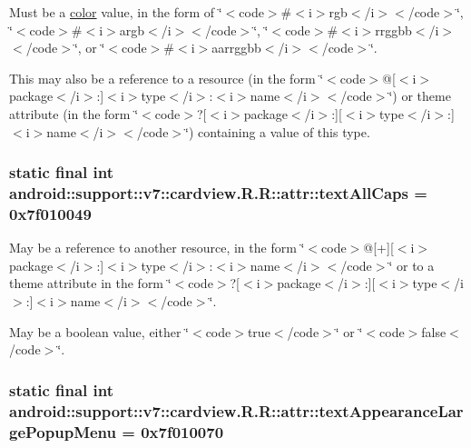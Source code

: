 Must be a \hyperlink{classandroid_1_1support_1_1v7_1_1cardview_1_1_r_1_1color}{color} value, in the form of \char`\"{}$<$code$>$\#$<$i$>$rgb$<$/i$>$$<$/code$>$\char`\"{}, \char`\"{}$<$code$>$\#$<$i$>$argb$<$/i$>$$<$/code$>$\char`\"{}, \char`\"{}$<$code$>$\#$<$i$>$rrggbb$<$/i$>$$<$/code$>$\char`\"{}, or \char`\"{}$<$code$>$\#$<$i$>$aarrggbb$<$/i$>$$<$/code$>$\char`\"{}. 

This may also be a reference to a resource (in the form \char`\"{}$<$code$>$@\mbox{[}$<$i$>$package$<$/i$>$:\mbox{]}$<$i$>$type$<$/i$>$:$<$i$>$name$<$/i$>$$<$/code$>$\char`\"{}) or theme attribute (in the form \char`\"{}$<$code$>$?\mbox{[}$<$i$>$package$<$/i$>$:\mbox{]}\mbox{[}$<$i$>$type$<$/i$>$:\mbox{]}$<$i$>$name$<$/i$>$$<$/code$>$\char`\"{}) containing a value of this type. \hypertarget{classandroid_1_1support_1_1v7_1_1cardview_1_1_r_1_1attr_3bbc968902d25f099a7cb6590fc8b185}{
\subsubsection[{textAllCaps}]{\setlength{\rightskip}{0pt plus 5cm}static final int android::support::v7::cardview.R.R::attr::textAllCaps = 0x7f010049}}
\label{classandroid_1_1support_1_1v7_1_1cardview_1_1_r_1_1attr_3bbc968902d25f099a7cb6590fc8b185}


May be a reference to another resource, in the form \char`\"{}$<$code$>$@\mbox{[}+\mbox{]}\mbox{[}$<$i$>$package$<$/i$>$:\mbox{]}$<$i$>$type$<$/i$>$:$<$i$>$name$<$/i$>$$<$/code$>$\char`\"{} or to a theme attribute in the form \char`\"{}$<$code$>$?\mbox{[}$<$i$>$package$<$/i$>$:\mbox{]}\mbox{[}$<$i$>$type$<$/i$>$:\mbox{]}$<$i$>$name$<$/i$>$$<$/code$>$\char`\"{}. 

May be a boolean value, either \char`\"{}$<$code$>$true$<$/code$>$\char`\"{} or \char`\"{}$<$code$>$false$<$/code$>$\char`\"{}. \hypertarget{classandroid_1_1support_1_1v7_1_1cardview_1_1_r_1_1attr_3b335fe9e1e66ac3308d7f590f89e3dd}{
\subsubsection[{textAppearanceLargePopupMenu}]{\setlength{\rightskip}{0pt plus 5cm}static final int android::support::v7::cardview.R.R::attr::textAppearanceLargePopupMenu = 0x7f010070}}
\label{classandroid_1_1support_1_1v7_1_1cardview_1_1_r_1_1attr_3b335fe9e1e66ac3308d7f590f89e3dd}


